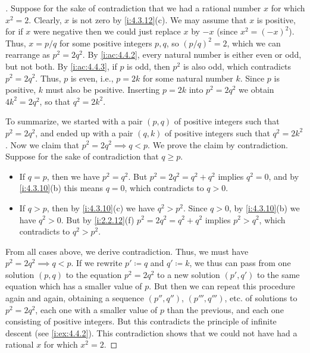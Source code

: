 \begin{proof}[]
  Suppose for the sake of contradiction that we had a rational number \(x\) for which \(x^2 = 2\).
  Clearly, \(x\) is not zero by \cref{i:4.3.12}(c).
  We may assume that \(x\) is positive, for if \(x\) were negative then we could just replace \(x\) by \(-x\)
  (since \(x^2 = (-x)^2\)).
  Thus, \(x = p / q\) for some positive integers \(p, q\), so \((p / q)^2 = 2\), which we can rearrange as \(p^2 = 2q^2\).
  By \cref{i:ac:4.4.2}, every natural number is either even or odd, but not both.
  By \cref{i:ac:4.4.3}, if \(p\) is odd, then \(p^2\) is also odd, which contradicts \(p^2 = 2q^2\).
  Thus, \(p\) is even, i.e., \(p = 2k\) for some natural number \(k\).
  Since \(p\) is positive, \(k\) must also be positive.
  Inserting \(p = 2k\) into \(p^2 = 2q^2\) we obtain \(4k^2 = 2q^2\), so that \(q^2 = 2k^2\).

  To summarize, we started with a pair \((p, q)\) of positive integers such that \(p^2 = 2q^2\), and ended up with a pair \((q, k)\) of positive integers such that \(q^2 = 2k^2\).
  Now we claim that \(p^2 = 2q^2 \implies q < p\).
  We prove the claim by contradiction.
  Suppose for the sake of contradiction that \(q \geq p\).
  \begin{itemize}
    \item If \(q = p\), then we have \(p^2 = q^2\).
          But \(p^2 = 2q^2 = q^2 + q^2\) implies \(q^2 = 0\), and by \cref{i:4.3.10}(b) this means \(q = 0\), which contradicts to \(q > 0\).
    \item If \(q > p\), then by \cref{i:4.3.10}(c) we have \(q^2 > p^2\).
          Since \(q > 0\), by \cref{i:4.3.10}(b) we have \(q^2 > 0\).
          But by \cref{i:2.2.12}(f) \(p^2 = 2q^2 = q^2 + q^2\) implies \(p^2 > q^2\), which contradicts to \(q^2 > p^2\).
  \end{itemize}
  From all cases above, we derive contradiction.
  Thus, we must have \(p^2 = 2q^2 \implies q < p\).
  If we rewrite \(p' \coloneqq q\) and \(q' \coloneqq k\), we thus can pass from one solution \((p, q)\) to the equation \(p^2 = 2q^2\) to a new solution \((p', q')\) to the same equation which has a smaller value of \(p\).
  But then we can repeat this procedure again and again, obtaining a sequence \((p'', q'')\), \((p''', q''')\), etc. of solutions to \(p^2 = 2q^2\), each one with a smaller value of \(p\) than the previous, and each one consisting of positive integers.
  But this contradicts the principle of infinite descent (see \cref{i:ex:4.4.2}).
  This contradiction shows that we could not have had a rational \(x\) for which \(x^2 = 2\).
\end{proof}

